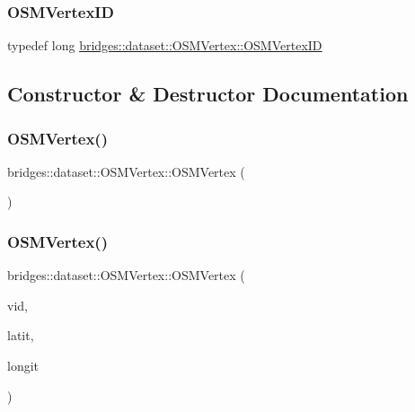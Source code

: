 \subsubsection{\texorpdfstring{O\+S\+M\+Vertex\+ID}{OSMVertexID}}
{\footnotesize\ttfamily typedef long \hyperlink{classbridges_1_1dataset_1_1_o_s_m_vertex_ad166f13b0aefbdc05a273546f2a3bb96}{bridges\+::dataset\+::\+O\+S\+M\+Vertex\+::\+O\+S\+M\+Vertex\+ID}}



\subsection{Constructor \& Destructor Documentation}
\mbox{\label{classbridges_1_1dataset_1_1_o_s_m_vertex_aa5d6ef7aef3bb762665aa6ab3a2658f6}} 
\subsubsection{\texorpdfstring{O\+S\+M\+Vertex()}{OSMVertex()}\hspace{0.1cm}{\footnotesize\ttfamily [1/3]}}
{\footnotesize\ttfamily bridges\+::dataset\+::\+O\+S\+M\+Vertex\+::\+O\+S\+M\+Vertex (\begin{DoxyParamCaption}{ }\end{DoxyParamCaption})\hspace{0.3cm}{\ttfamily [inline]}}

\mbox{\label{classbridges_1_1dataset_1_1_o_s_m_vertex_a9ad9739ae1da536fe5e66b2f07b8ba1d}} 
\subsubsection{\texorpdfstring{O\+S\+M\+Vertex()}{OSMVertex()}\hspace{0.1cm}{\footnotesize\ttfamily [2/3]}}
{\footnotesize\ttfamily bridges\+::dataset\+::\+O\+S\+M\+Vertex\+::\+O\+S\+M\+Vertex (\begin{DoxyParamCaption}\item[{\hyperlink{classbridges_1_1dataset_1_1_o_s_m_vertex_ad166f13b0aefbdc05a273546f2a3bb96}{O\+S\+M\+Vertex\+ID}}]{vid,  }\item[{double}]{latit,  }\item[{double}]{longit }\end{DoxyParamCaption})\hspace{0.3cm}{\ttfamily [inline]}}

